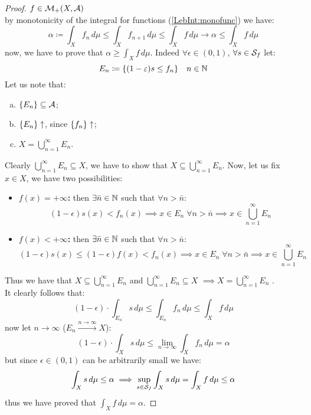 \begin{proof}
    $f\in\mathcal{M}_+(X,\mathcal{A})$ \\
    by monotonicity of the integral for functions (\ref{LebInt:monofunc}) we have:
    \[
        \alpha \coloneqq \int_X f_n \, d\mu \leq \int_X f_{n+1} \, d\mu \leq \int_X f \, d\mu  \longrightarrow \alpha \leq \int_X f \, d\mu
    \]
    now, we have to prove that $\alpha \geq \int_X f \, d\mu$. Indeed $\forall \epsilon \in (0,1)$, $\forall s \in \mathcal{S}_f$ let:
    \[
        E_n \coloneqq \{ (1-\varepsilon) s \leq f_n \} \quad n\in\mathbb{N}    
    \]
    Let us note that:
    \begin{enumerate}[a)]
        \item $\{ E_n \} \subseteq \mathcal{A}$;
        \item $\{ E_n \} \uparrow$, since $\{ f_n \} \uparrow$;
        \item $X=\bigcup_{n=1}^\infty E_n$.
    \end{enumerate}
    Clearly $\bigcup_{n=1}^\infty E_n \subseteq X$, we have to show that $X \subseteq \bigcup_{n=1}^\infty E_n$. Now, let us fix $x\in X$, we have two possibilities:
    \begin{itemize}
        \item \textbf{$f(x)=+\infty$:} then $\exists \bar{n}\in\mathbb{N}$ such that $\forall n> \bar{n}$:
            \[
                (1-\epsilon) s(x) < f_n(x) \implies x\in E_n \; \forall n > \bar{n} \implies x \in \bigcup_{n=1}^\infty E_n
            \]
        \item \textbf{$f(x)<+\infty$:} then $\exists \bar{n}\in\mathbb{N}$ such that $\forall n> \bar{n}$:
            \[
                (1-\epsilon) s(x) \leq (1-\epsilon) f(x) < f_n(x) \implies x\in E_n \; \forall n > \bar{n} \implies x \in \bigcup_{n=1}^\infty E_n
            \]
    \end{itemize}
    Thus we have that $X \subseteq \bigcup_{n=1}^\infty E_n$ and $\bigcup_{n=1}^\infty E_n \subseteq X$ $\implies X = \bigcup_{n=1}^\infty E_n$ . \\
    It clearly follows that:
    \[
        (1-\epsilon)\cdot \int_{E_n} s \, d\mu \leq \int_{E_n} f_n \, d\mu \leq \int_X f \, d\mu    
    \]
    now let $n\to\infty$ ($E_n \xrightarrow{n\to\infty} X$):
    \[
        (1-\epsilon)\cdot \int_{X} s \, d\mu \leq  \lim_{n\to\infty} \int_{X} f_n \, d\mu = \alpha 
    \]
    but since $\epsilon \in (0,1)$ can be arbitrarily small we have:
    \[
        \int_X s \, d\mu \leq \alpha \implies \sup_{s\in\mathcal{S}_f} \int_X s \, d\mu  = \int_X f \, d\mu \leq \alpha    
    \]
    thus we have proved that $\int_X f \, d\mu = \alpha $.
\end{proof}

